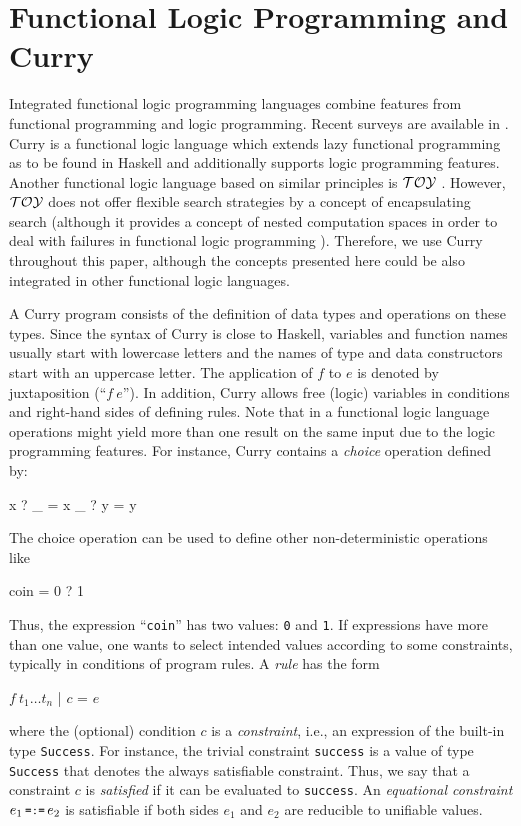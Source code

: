 \documentclass[english]{lni}
\newcommand{\code}[1]{\texttt{\small{}#1}}
\newcommand{\ccode}[1]{``\code{#1}''}
\begin{document}
\section{Functional Logic Programming and Curry}
\label{sec:curry}

Integrated functional logic programming languages
combine features from functional programming and logic programming.
Recent surveys are available in \cite{AntoyHanus10CACM,Hanus07ICLP}.
Curry \cite{Hanus06Curry} is a functional logic language
which extends lazy functional programming as to be found in
Haskell \cite{PeytonJones03Haskell} and additionally supports
logic programming features.
Another functional logic language based on similar principles is
${\cal TOY}$ \cite{Lopez-FraguasSanchez-Hernandez99}.
However, ${\cal TOY}$ does not offer flexible search strategies
by a concept of encapsulating search
(although it provides a concept of nested computation spaces
in order to deal with failures in functional logic
programming \cite{LopezSanchez04,SanchezHernandez06}).
Therefore, we use Curry throughout this paper, although
the concepts presented here could be also integrated in
other functional logic languages.

A Curry program consists of the definition of data types and
operations on these types. 
Since the syntax of Curry is close to Haskell,
variables and function names usually
start with lowercase letters and the names of type and data constructors
start with an uppercase letter. The application of $f$
to $e$ is denoted by juxtaposition (``$f~e$'').
In addition, Curry allows free (logic) 
variables in conditions and right-hand sides of defining rules.
Note that in a functional logic language
operations might yield more than one result on the same input due to 
the logic programming features.
For instance, Curry contains a \emph{choice} operation defined by:
%
\begin{curry}
x ? _ = x
_ ? y = y
\end{curry}
%
The choice operation can be used to define other non-deterministic operations
like
%
\begin{curry}
coin = 0 ? 1  
\end{curry}
Thus, the expression \ccode{coin} has two values: \code{0} and \code{1}.
If expressions have more than one value, one wants to select
intended values according to some constraints,
typically in conditions of program rules.
A \emph{rule} has the form
\begin{curry}
$f~t_1\ldots{}t_n$ | $c$ = $e$
\end{curry}
where the (optional) condition $c$ is a \emph{constraint},
i.e., an expression of the built-in type
\code{Success}. For instance, the trivial constraint
\code{success} is a value of type \code{Success} that
denotes the always satisfiable constraint.
Thus, we say that a constraint $c$ is \emph{satisfied} if it
can be evaluated to \code{success}.
An \emph{equational constraint} $e_1 \,\code{=:=}\, e_2$ is satisfiable
if both sides $e_1$ and $e_2$ are reducible to unifiable values.
\end{document}
